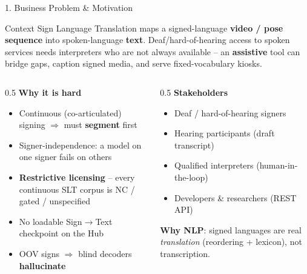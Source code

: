 \documentclass[10pt,aspectratio=169]{beamer}
\begin{document}
\begin{frame}{1. Business Problem \& Motivation}
\begin{block}{Context}
Sign Language Translation maps a signed-language \textbf{video / pose sequence} into spoken-language \textbf{text}. Deaf/hard-of-hearing access to spoken services needs interpreters who are not always available -- an \textbf{assistive} tool can bridge gaps, caption signed media, and serve fixed-vocabulary kiosks.
\end{block}

\begin{columns}[T]
\begin{column}{0.5\textwidth}
\textbf{Why it is hard}
\begin{itemize}
  \item Continuous (co-articulated) signing $\Rightarrow$ must \textbf{segment} first
  \item Signer-independence: a model on one signer fails on others
  \item \textbf{Restrictive licensing} -- every continuous SLT corpus is NC / gated / unspecified
  \item No loadable Sign$\rightarrow$Text checkpoint on the Hub
  \item OOV signs $\Rightarrow$ blind decoders \textbf{hallucinate}
\end{itemize}
\end{column}
\begin{column}{0.5\textwidth}
\textbf{Stakeholders}
\begin{itemize}
  \item Deaf / hard-of-hearing signers
  \item Hearing participants (draft transcript)
  \item Qualified interpreters (human-in-the-loop)
  \item Developers \& researchers (REST API)
\end{itemize}
\textbf{Why NLP}: signed languages are real \emph{translation} (reordering + lexicon), not transcription.
\end{column}
\end{columns}
\end{frame}
\end{document}

